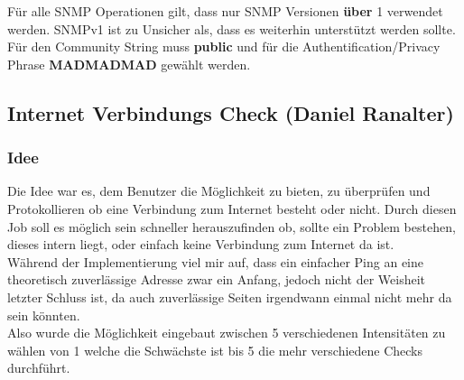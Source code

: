 \documentclass[12pt,a4paper]{report}
\begin{document}
\begin{onehalfspace}
Für alle SNMP Operationen gilt, dass nur SNMP Versionen \textbf{über} 1 verwendet werden. SNMPv1 ist zu Unsicher als, dass es weiterhin unterstützt werden sollte. Für den Community String muss \textbf{public} und für die Authentification/Privacy Phrase \textbf{MADMADMAD} gewählt werden. 

\subsection{Internet Verbindungs Check (Daniel Ranalter)}
\subsubsection{Idee}
Die Idee war es, dem Benutzer die Möglichkeit zu bieten, zu überprüfen und Protokollieren ob eine Verbindung zum Internet besteht oder nicht. Durch diesen Job soll es möglich sein schneller herauszufinden ob, sollte ein Problem bestehen, dieses intern liegt, oder einfach keine Verbindung zum Internet da ist.\\
Während der Implementierung viel mir auf, dass ein einfacher Ping an eine theoretisch zuverlässige Adresse zwar ein Anfang, jedoch nicht der Weisheit letzter Schluss ist, da auch zuverlässige Seiten irgendwann einmal nicht mehr da sein könnten.\\
Also wurde die Möglichkeit eingebaut zwischen 5 verschiedenen Intensitäten zu wählen von 1 welche die Schwächste ist bis 5 die mehr verschiedene Checks durchführt. 


\end{onehalfspace}
\end{document}
